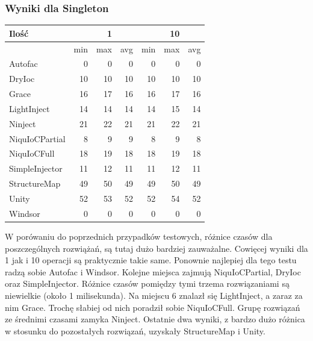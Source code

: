 \documentclass[12pt]{article}
\begin{document}
\subsubsection{Wyniki dla Singleton}
\begin{center}
\begin{small}
	\begin{tabular}{ | l | r r r | r r r | }
    		\hline
Ilość & & 1 & & & 10 & \\ \hline
 & min & max & avg & min & max & avg \\ \hline
Autofac & 0 & 0 & 0 & 0 & 0 & 0 \\ \hline
DryIoc & 10 & 10 & 10 & 10 & 10 & 10 \\ \hline
Grace & 16 & 17 & 16 & 16 & 17 & 16 \\ \hline
LightInject & 14 & 14 & 14 & 14 & 15 & 14 \\ \hline
Ninject & 21 & 22 & 21 & 21 & 22 & 21 \\ \hline
NiquIoCPartial & 8 & 9 & 9 & 8 & 9 & 8 \\ \hline
NiquIoCFull & 18 & 19 & 18 & 18 & 19 & 18 \\ \hline
SimpleInjector & 11 & 12 & 11 & 11 & 12 & 11 \\ \hline
StructureMap & 49 & 50 & 49 & 49 & 50 & 49 \\ \hline
Unity & 52 & 53 & 52 & 52 & 54 & 52 \\ \hline
Windsor & 0 & 0 & 0 & 0 & 0 & 0 \\ \hline
  	\end{tabular}
\end{small}
\end{center}
W porówaniu do poprzednich przypadków testowych, różnice czasów dla poszczególnych rozwiążań, są tutaj dużo bardziej zauważalne. Cowięcej wyniki dla 1 jak i 10 operacji są praktycznie takie same. Ponownie najlepiej dla tego testu radzą sobie Autofac i Windsor. Kolejne miejsca zajmują NiquIoCPartial, DryIoc oraz SimpleInjector. Różnice czasów pomiędzy tymi trzema rozwiązaniami są niewielkie (około 1 milisekunda). Na miejscu 6 znalazł się LightInject, a zaraz za nim Grace. Trochę słabiej od nich poradził sobie NiquIoCFull. Grupę rozwiązań ze średnimi czasami zamyka Ninject. Ostatnie dwa wyniki, z bardzo dużo różnica w stosunku do pozostałych rozwiązań, uzyskały StructureMap i Unity.
\end{document}
